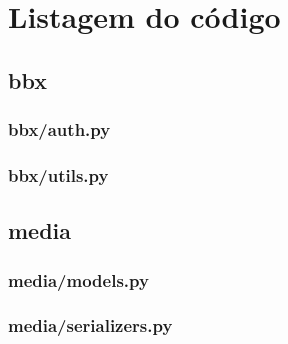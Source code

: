 \newcommand{\codeFolder}{../../app/django-bbx}
                   
\chapter{Listagem do código}
\label{ApendiceA}

\section{bbx}

\subsection{bbx/auth.py}


\subsection{bbx/utils.py}


\section{media}

%

%

\subsection{media/models.py}


\subsection{media/serializers.py}



